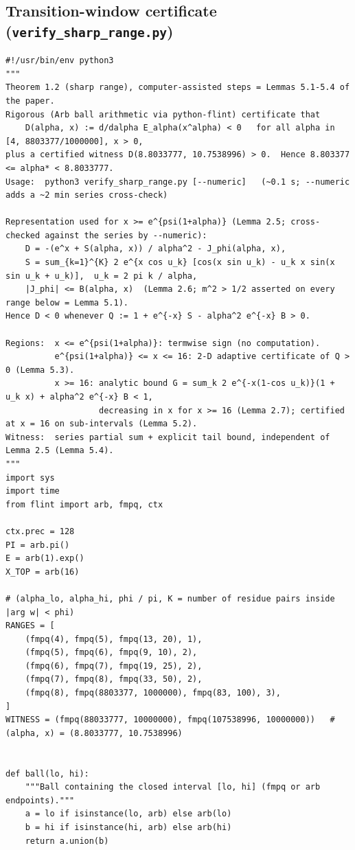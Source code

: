\documentclass[11pt,a4paper]{article}
\theoremstyle{plain}
\theoremstyle{remark}
\begin{document}
\subsection{Transition-window certificate (\texttt{verify\_sharp\_range.py})}\label{app:C}
\begin{lstlisting}
#!/usr/bin/env python3
"""
Theorem 1.2 (sharp range), computer-assisted steps = Lemmas 5.1-5.4 of the paper.
Rigorous (Arb ball arithmetic via python-flint) certificate that
    D(alpha, x) := d/dalpha E_alpha(x^alpha) < 0   for all alpha in [4, 8803377/1000000], x > 0,
plus a certified witness D(8.8033777, 10.7538996) > 0.  Hence 8.803377 <= alpha* < 8.8033777.
Usage:  python3 verify_sharp_range.py [--numeric]   (~0.1 s; --numeric adds a ~2 min series cross-check)

Representation used for x >= e^{psi(1+alpha)} (Lemma 2.5; cross-checked against the series by --numeric):
    D = -(e^x + S(alpha, x)) / alpha^2 - J_phi(alpha, x),
    S = sum_{k=1}^{K} 2 e^{x cos u_k} [cos(x sin u_k) - u_k x sin(x sin u_k + u_k)],  u_k = 2 pi k / alpha,
    |J_phi| <= B(alpha, x)  (Lemma 2.6; m^2 > 1/2 asserted on every range below = Lemma 5.1).
Hence D < 0 whenever Q := 1 + e^{-x} S - alpha^2 e^{-x} B > 0.

Regions:  x <= e^{psi(1+alpha)}: termwise sign (no computation).
          e^{psi(1+alpha)} <= x <= 16: 2-D adaptive certificate of Q > 0 (Lemma 5.3).
          x >= 16: analytic bound G = sum_k 2 e^{-x(1-cos u_k)}(1 + u_k x) + alpha^2 e^{-x} B < 1,
                   decreasing in x for x >= 16 (Lemma 2.7); certified at x = 16 on sub-intervals (Lemma 5.2).
Witness:  series partial sum + explicit tail bound, independent of Lemma 2.5 (Lemma 5.4).
"""
import sys
import time
from flint import arb, fmpq, ctx

ctx.prec = 128
PI = arb.pi()
E = arb(1).exp()
X_TOP = arb(16)

# (alpha_lo, alpha_hi, phi / pi, K = number of residue pairs inside |arg w| < phi)
RANGES = [
    (fmpq(4), fmpq(5), fmpq(13, 20), 1),
    (fmpq(5), fmpq(6), fmpq(9, 10), 2),
    (fmpq(6), fmpq(7), fmpq(19, 25), 2),
    (fmpq(7), fmpq(8), fmpq(33, 50), 2),
    (fmpq(8), fmpq(8803377, 1000000), fmpq(83, 100), 3),
]
WITNESS = (fmpq(88033777, 10000000), fmpq(107538996, 10000000))   # (alpha, x) = (8.8033777, 10.7538996)


def ball(lo, hi):
    """Ball containing the closed interval [lo, hi] (fmpq or arb endpoints)."""
    a = lo if isinstance(lo, arb) else arb(lo)
    b = hi if isinstance(hi, arb) else arb(hi)
    return a.union(b)



\end{lstlisting}
\end{document}
